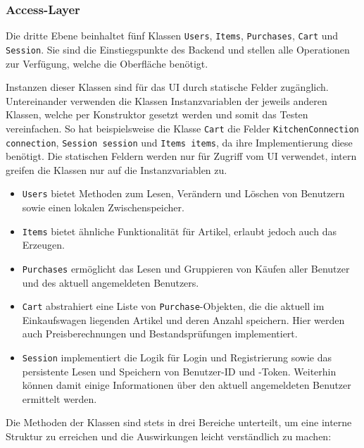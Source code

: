 \subsubsection{Access-Layer} \label{subsubsec:access-layer}

Die dritte Ebene beinhaltet fünf Klassen \texttt{Users}, \texttt{Items}, \texttt{Purchases}, \texttt{Cart} und \texttt{Session}.
Sie sind die Einstiegspunkte des Backend und stellen alle Operationen zur Verfügung, welche die Oberfläche benötigt.

Instanzen dieser Klassen sind für das UI durch statische Felder zugänglich.
Untereinander verwenden die Klassen Instanzvariablen der jeweils anderen Klassen, welche per Konstruktor gesetzt werden und somit das Testen vereinfachen.
So hat beispielsweise die Klasse \texttt{Cart} die Felder \texttt{KitchenConnection connection}, \texttt{Session session} und \texttt{Items items}, da ihre Implementierung diese benötigt.
Die statischen Feldern werden nur für Zugriff vom UI verwendet, intern greifen die Klassen nur auf die Instanzvariablen zu.

\begin{itemize}
	\item \texttt{Users} bietet Methoden zum Lesen, Verändern und Löschen von Benutzern sowie einen lokalen Zwischenspeicher.
	\item \texttt{Items} bietet ähnliche Funktionalität für Artikel, erlaubt jedoch auch das Erzeugen.
	\item \texttt{Purchases} ermöglicht das Lesen und Gruppieren von Käufen aller Benutzer und des aktuell angemeldeten Benutzers.
	\item \texttt{Cart} abstrahiert eine Liste von \texttt{Purchase}-Objekten, die die aktuell im Einkaufswagen liegenden Artikel und deren Anzahl speichern.
	Hier werden auch Preisberechnungen und Bestandsprüfungen implementiert.
	\item \texttt{Session} implementiert die Logik für Login und Registrierung sowie das persistente Lesen und Speichern von Benutzer-ID und -Token.
	Weiterhin können damit einige Informationen über den aktuell angemeldeten Benutzer ermittelt werden.
\end{itemize}

Die Methoden der Klassen sind stets in drei Bereiche unterteilt, um eine interne Struktur zu erreichen und die Auswirkungen leicht verständlich zu machen:

